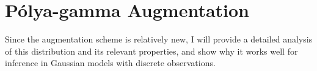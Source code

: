 \chapter{P\'{o}lya-gamma Augmentation}
\label{AppendixA}

Since the \polyagamma augmentation scheme is relatively new, I will 
provide a detailed analysis of this distribution and its relevant 
properties, and show why it works well for inference in Gaussian 
models with discrete observations.

